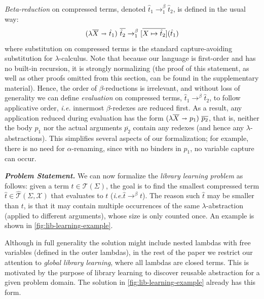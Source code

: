 \documentclass[acmsmall,screen,nonacm,review=false,timestamp=false]{acmart}
\newcommand{\ie}{\emph{i.e.}\xspace}
\newcommand{\emphbf}[1]{\emph{\textbf{#1}\xspace}}
\newcommand{\mypara}[1]{\smallskip\noindent\emphbf{#1.}\xspace}
\newcommand{\many}[1]{\overline{#1}}
\newcommand{\termsof}[1]{\mathcal{T}(#1)}
\newcommand{\absof}[2]{\hat{\mathcal{T}}(#1,#2)}
\newcommand{\sapp}[2]{{#1}({#2})}
\newcommand{\bnd}{\ \mathbf{\shortrightarrow}\ }
\newcommand{\rwsteps}[1]{\rightarrow^{#1}_1}
\newcommand{\rewrites}[1]{\rightarrow^{#1}}
\newcommand{\betared}{\rwsteps{\beta}}
\newcommand{\evals}{\rewrites{\beta}}
\begin{document}
\emph{Beta-reduction} on compressed terms, denoted $\hat{t}_1 \betared \hat{t}_2$, is defined in the usual way:
\[
  (\lambda \many{X} \bnd \hat{t}_1)\ \many{\hat{t}_2}  \betared \sapp{[\many{X \mapsto \hat{t}_2}]}{\hat{t}_1} 
\]
where substitution on compressed terms is the standard capture-avoiding substitution for $\lambda$-calculus.
Note that because our language is first-order and has no built-in recursion,
it is strongly normalizing
(the proof of this statement, as well as other proofs omitted from this section, can be found in the supplementary material).
Hence, the order of $\beta$-reductions is irrelevant,
and without loss of generality we can define \emph{evaluation} on compressed terms, $\hat{t}_1 \evals \hat{t}_2$,
to follow applicative order, \ie innermost $\beta$-redexes are reduced first.
As a result, any application reduced during evaluation
has the form $(\lambda \many{X} \bnd p_1)\ \many{p_2}$,
that is, neither the body $p_1$ nor the actual arguments $\many{p_2}$ contain any redexes
(and hence any $\lambda$-abstractions).
This simplifies several aspects of our formalization;
for example, there is no need for $\alpha$-renaming, 
since with no binders in $p_1$, no variable capture can occur.


\mypara{Problem Statement}
We can now formalize
  the \emph{library learning problem} as follows:
  given a term $t \in \termsof{\Sigma}$,
  the goal is to find the smallest compressed term $\hat{t} \in \absof{\Sigma}{\mathcal{X}}$
  that evaluates to $t$ (\ie $\hat{t} \evals t$).
The reason such $\hat{t}$ may be smaller than $t$,
  is that it may contain multiple occurrences of the same $\lambda$-abstraction
  (applied to different arguments),
  whose size is only counted once.
An example is shown
  in \autoref{fig:lib-learning-example}.

Although in full generality the solution might include nested lambdas with free variables
(defined in the outer lambdas),
in the rest of the paper we restrict our attention to \emph{global library learning},
where all lambdas are closed terms.
This is motivated by the purpose of library learning
to discover reusable abstraction for a given problem domain.
The solution in \autoref{fig:lib-learning-example} already has this form.
\end{document}
